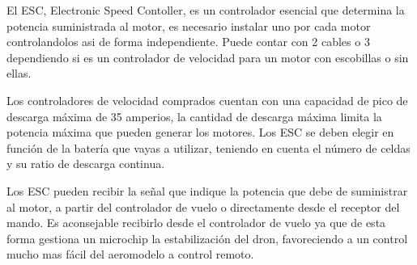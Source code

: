 
 El ESC, Electronic Speed Contoller, es un controlador esencial que determina la potencia suministrada al motor, es necesario instalar uno por cada motor controlandolos asi de forma independiente. 
 Puede contar con 2 cables o 3 dependiendo si es un controlador de velocidad para un motor con escobillas o sin ellas.
 
 Los controladores de velocidad comprados cuentan con una capacidad de pico de descarga máxima de 35 amperios, la cantidad de descarga máxima limita la potencia máxima que pueden generar los motores. Los ESC se deben elegir en función de la batería que vayas a utilizar, teniendo en cuenta el número de celdas y su ratio de descarga continua.
 
 Los ESC pueden recibir la señal que indique la potencia que debe de suministrar al motor, a partir del controlador de vuelo o directamente desde el receptor del mando. Es aconsejable recibirlo desde el controlador de vuelo ya que de esta forma gestiona un microchip la estabilización del dron, favoreciendo a un control mucho mas fácil del aeromodelo a control remoto.

 
 